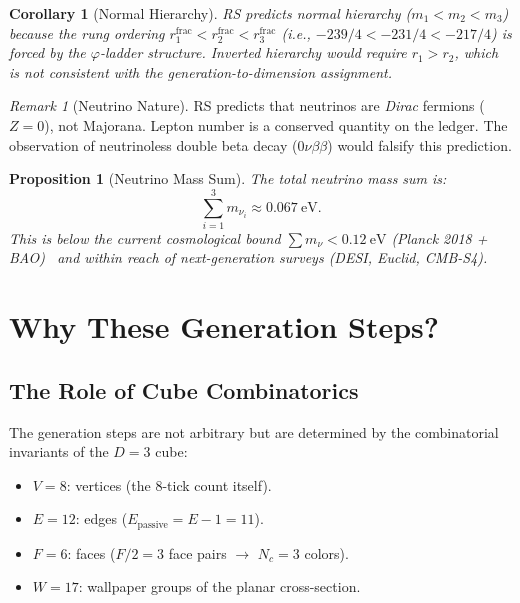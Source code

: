 \documentclass[12pt,a4paper]{article}
\newtheorem{corollary}[theorem]{Corollary}
\newtheorem{proposition}[theorem]{Proposition}
\theoremstyle{definition}
\theoremstyle{remark}
\newtheorem{remark}[theorem]{Remark}
\begin{document}
\begin{corollary}[Normal Hierarchy]
\label{cor:normal-hierarchy}
RS predicts normal hierarchy ($m_1 < m_2 < m_3$) because the
rung ordering $r_1^{\mathrm{frac}} < r_2^{\mathrm{frac}} <
r_3^{\mathrm{frac}}$ (i.e., $-239/4 < -231/4 < -217/4$) is
forced by the $\varphi$-ladder structure.  Inverted hierarchy
would require $r_1 > r_2$, which is not consistent with the
generation-to-dimension assignment.
\end{corollary}

\begin{remark}[Neutrino Nature]
RS predicts that neutrinos are \emph{Dirac} fermions
($Z = 0$), not Majorana.  Lepton number is a conserved
quantity on the ledger.  The observation of neutrinoless
double beta decay ($0\nu\beta\beta$) would falsify this
prediction.
\end{remark}

\begin{proposition}[Neutrino Mass Sum]
\label{prop:nu-sum}
The total neutrino mass sum is:
\begin{equation}
  \sum_{i=1}^{3} m_{\nu_i} \approx 0.067~\mathrm{eV}.
\end{equation}
This is below the current cosmological bound
$\sum m_\nu < 0.12~\mathrm{eV}$ (Planck 2018 +
BAO)~\cite{Planck2018} and within reach of next-generation
surveys (DESI, Euclid, CMB-S4).
\end{proposition}

\section{Why These Generation Steps?}
\label{sec:steps}

\subsection{The Role of Cube Combinatorics}

The generation steps are not arbitrary but are determined
by the combinatorial invariants of the $D = 3$ cube:
\begin{itemize}
  \item $V = 8$: vertices (the 8-tick count itself).
  \item $E = 12$: edges ($E_{\mathrm{passive}} = E - 1 = 11$).
  \item $F = 6$: faces ($F/2 = 3$ face pairs $\to$ $N_c = 3$
  colors).
  \item $W = 17$: wallpaper groups of the planar cross-section.
\end{itemize}
\end{document}
